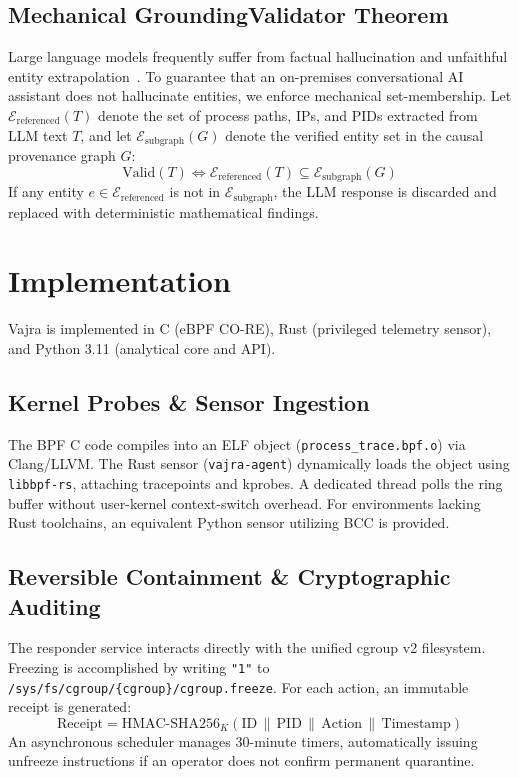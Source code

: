 \documentclass[conference]{IEEEtran}
\begin{document}
\subsection{Mechanical GroundingValidator Theorem}
Large language models frequently suffer from factual hallucination and unfaithful entity extrapolation~\cite{rawte2023survey}. To guarantee that an on-premises conversational AI assistant does not hallucinate entities, we enforce mechanical set-membership. Let $\mathcal{E}_{\text{referenced}}(T)$ denote the set of process paths, IPs, and PIDs extracted from LLM text $T$, and let $\mathcal{E}_{\text{subgraph}}(G)$ denote the verified entity set in the causal provenance graph $G$:
\begin{equation}
\text{Valid}(T) \iff \mathcal{E}_{\text{referenced}}(T) \subseteq \mathcal{E}_{\text{subgraph}}(G)
\end{equation}
If any entity $e \in \mathcal{E}_{\text{referenced}}$ is not in $\mathcal{E}_{\text{subgraph}}$, the LLM response is discarded and replaced with deterministic mathematical findings.

\section{Implementation}
\label{sec:implementation}
Vajra is implemented in C (eBPF CO-RE), Rust (privileged telemetry sensor), and Python 3.11 (analytical core and API).

\subsection{Kernel Probes \& Sensor Ingestion}
The BPF C code compiles into an ELF object (\texttt{process\_trace.bpf.o}) via Clang/LLVM. The Rust sensor (\texttt{vajra-agent}) dynamically loads the object using \texttt{libbpf-rs}, attaching tracepoints and kprobes. A dedicated thread polls the ring buffer without user-kernel context-switch overhead. For environments lacking Rust toolchains, an equivalent Python sensor utilizing BCC is provided.

\subsection{Reversible Containment \& Cryptographic Auditing}
The responder service interacts directly with the unified cgroup v2 filesystem. Freezing is accomplished by writing \texttt{"1"} to \texttt{/sys/fs/cgroup/\{cgroup\}/cgroup.freeze}. For each action, an immutable receipt is generated:
\begin{equation}
\text{Receipt} = \text{HMAC-SHA256}_{K}(\text{ID} \,\|\, \text{PID} \,\|\, \text{Action} \,\|\, \text{Timestamp})
\end{equation}
An asynchronous scheduler manages 30-minute timers, automatically issuing unfreeze instructions if an operator does not confirm permanent quarantine.
\end{document}
